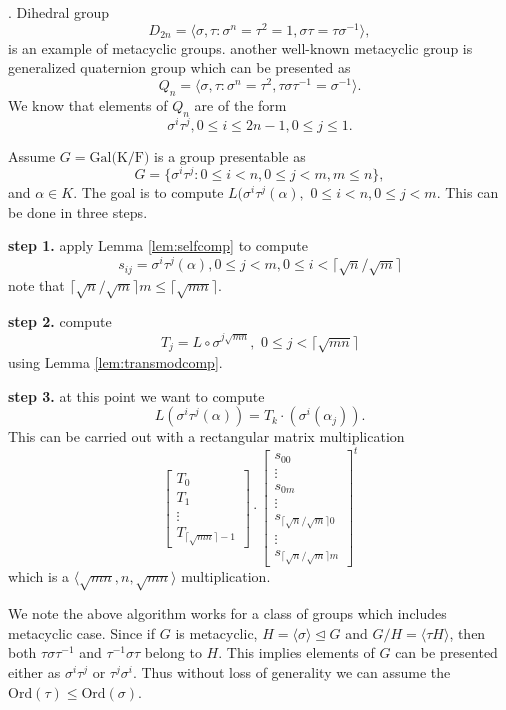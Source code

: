 . Dihedral group 
$$D_{2n} = \langle \sigma,\tau: \sigma^n =\tau^2 = 1, \sigma \tau = \tau \sigma^{-1} \rangle, $$
is an example of metacyclic groups. another well-known metacyclic group is generalized quaternion
 group which can be presented as
 $$Q_n = \langle \sigma,\tau: \sigma^n =\tau^2, \tau \sigma \tau^{-1} = \sigma^{-1} \rangle.$$
 We know that elements of $Q_n$ are of the form 
 $$\sigma^i\tau^j, 0 \leq i \leq 2n-1 , 0\leq j \leq 1.$$
 
Assume $G = \mathrm{Gal(K/F})$ is a group presentable as
$$G = \lbrace \sigma^i \tau^j: 0\leq i < n, 0 \leq j < m, m\leq n \rbrace,$$
and $\alpha\in K$. The goal is to compute 
$L(\sigma^i\tau^j (\alpha), \,\, 0\leq i < n, 0 \leq j <m.$
This can be done in three steps.

\textbf{step 1.} apply Lemma \ref{lem:selfcomp} to compute 
$$s_{ij} = \sigma^i\tau^j(\alpha), 0 \leq j < m, 0\leq i < \lceil \sqrt{n}/\sqrt{m} \rceil$$
note that $\lceil \sqrt{n}/\sqrt{m} \rceil m \leq \lceil \sqrt{mn} \rceil$.

\textbf{step 2.} compute $$T_j = L \circ \sigma^{j\sqrt{mn}}, \,\, 0\leq j < \lceil \sqrt{mn}\rceil$$
using Lemma	\ref{lem:transmodcomp}.

\textbf{step 3.} at this point we want to compute 
$$L(\sigma^i\tau^j(\alpha)) = T_k\cdot(\sigma^i(\alpha_j)).$$
This can be carried out with a rectangular matrix multiplication
$$
\left[ \begin{array}{c}
T_0\\
\hline
T_1\\
\hline
\vdots\\
\hline
T_{\lceil \sqrt{mn} \rceil-1}
\end{array} 
\right]
\cdot
\left[\begin{array}{l}
s_{00} \\
\hline
 \vdots \\
 \hline
s_{0m} \\
 \hline
\vdots \\
\hline
s_{\lceil \sqrt{n}/\sqrt{m} \rceil 0} \\
\hline
\vdots \\
\hline
s_{\lceil \sqrt{n}/\sqrt{m} \rceil m}
\end{array}
\right]^t
$$
which is a $\langle \sqrt{mn},n,\sqrt{mn}\rangle$ multiplication. 

We note the above algorithm works for a class of groups which includes metacyclic case. Since if $G$ is metacyclic, 
$H = \langle \sigma \rangle \unlhd G$ and $G/H = \langle \tau H \rangle$, then both $\tau \sigma \tau^{-1}$ and 
$\tau^{-1} \sigma \tau$ belong to $H$. This implies elements of $G$ can be presented either as $\sigma^i\tau^j$
or $\tau^j\sigma^i$. Thus without loss of generality we can assume the $\textrm{Ord}(\tau) \leq \textrm{Ord}(\sigma)$.

